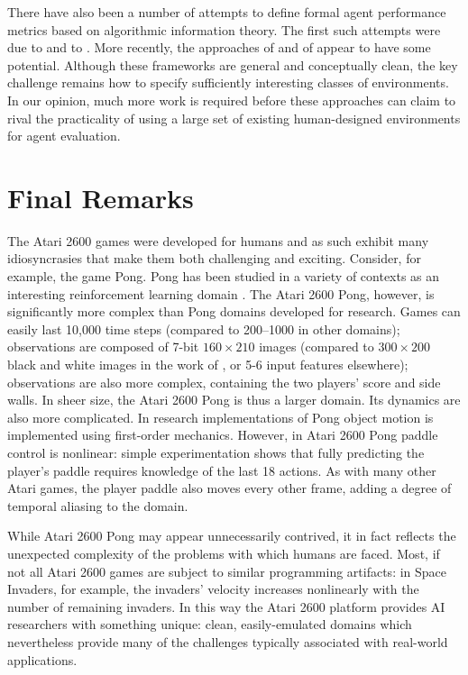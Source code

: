 \documentclass[twoside,11pt]{article}
\newcommand{\gamename}[1]{{\sc #1}}
\begin{document}
There have also been a number of attempts to define formal agent performance metrics based on algorithmic information theory.
The first such attempts were due to  and to .
More recently, the approaches of  and of  appear to have some potential.
Although these frameworks are general and conceptually clean, the key challenge remains how to specify sufficiently interesting classes of environments.
In our opinion, much more work is required before these approaches can claim to rival the practicality of using a large set of existing human-designed environments for agent evaluation.

\section{Final Remarks}
\label{sec:final-remarks}

The Atari 2600 games were developed for humans and as such exhibit many idiosyncrasies that make them both challenging and exciting. Consider, for example, the game \gamename{Pong}. \gamename{Pong} has been studied in a variety of contexts as an interesting reinforcement learning domain \cite{cobo2011,stober08pixels,monroy06coevolution}. The Atari 2600 \gamename{Pong}, however, is significantly more complex than \gamename{Pong} domains developed for research. Games can easily last 10,000 time steps (compared to 200--1000 in other domains); observations are composed of 7-bit $160 \times 210$ images (compared to $300 \times 200$ black and white images in the work of , or 5-6 input features elsewhere); observations are also more complex, containing the two players' score and side walls. In sheer size, the Atari 2600 \gamename{Pong} is thus a larger domain. Its dynamics are also more complicated.  In research implementations of \gamename{Pong} object motion is implemented using first-order mechanics.  However, in Atari 2600 \gamename{Pong} paddle control is nonlinear: simple experimentation shows that fully predicting the player's paddle requires knowledge of the last 18 actions. As with many other Atari games, the player paddle also moves every other frame, adding a degree of temporal aliasing to the domain. 

While Atari 2600 \gamename{Pong} may appear unnecessarily contrived, it in fact reflects the unexpected complexity of the problems with which humans are faced. Most, if not all Atari 2600 games are subject to similar programming artifacts: in \gamename{Space Invaders}, for example, the invaders' velocity increases nonlinearly with the number of remaining invaders. In this way the Atari 2600 platform provides AI researchers with something unique: clean, easily-emulated domains which nevertheless provide many of the challenges typically associated with real-world applications.
\end{document}
